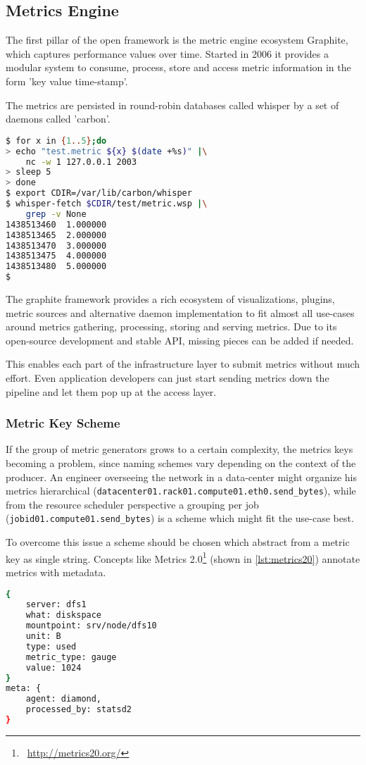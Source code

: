\subsection{Metrics Engine}
The first pillar of the open framework is the metric engine ecosystem Graphite, which captures performance values over time. 
Started in 2006 it provides a modular system to consume, process, store and access metric information in the form 'key value time-stamp'.

The metrics are persisted in round-robin databases called whisper by a set of daemons called 'carbon'.

\begin{lstlisting}[language=bash,
    caption={Sending and receiving metrics using carbon in combination with a whisper file back-end.},
    label={lst:carbon_wsp}]
$ for x in {1..5};do
> echo "test.metric ${x} $(date +%s)" |\
    nc -w 1 127.0.0.1 2003
> sleep 5
> done
$ export CDIR=/var/lib/carbon/whisper
$ whisper-fetch $CDIR/test/metric.wsp |\
    grep -v None
1438513460	1.000000
1438513465	2.000000
1438513470	3.000000
1438513475	4.000000
1438513480	5.000000
$
\end{lstlisting}

The graphite framework provides a rich ecosystem of visualizations, plugins, metric sources and alternative daemon implementation to fit almost
all use-cases around metrics gathering, processing, storing and serving metrics. Due to its open-source development and stable API, missing pieces
can be added if needed.

This enables each part of the infrastructure layer to submit metrics without much effort. Even application developers can just start sending metrics down the pipeline and
let them pop up at the access layer.

\subsubsection{Metric Key Scheme}

If the group of metric generators grows to a certain complexity, the metrics keys becoming a problem, since naming schemes vary depending on the context of
the producer. An engineer overseeing the network in a data-center might organize his metrics hierarchical (\lstinline{datacenter01.rack01.compute01.eth0.send_bytes}), while from the
resource scheduler perspective a grouping per job (\lstinline{jobid01.compute01.send_bytes}) is a scheme which might fit the use-case best.

To overcome this issue a scheme should be chosen which abstract from a metric key as single string.
Concepts like Metrics 2.0\footnote{\Mundus~\url{http://metrics20.org/}} (shown in \autoref{lst:metrics20}) annotate metrics with metadata.

\begin{lstlisting}[language=bash,
    caption={Metrics2.0 formatted metric},
    label={lst:metrics20}]
{
    server: dfs1
    what: diskspace
    mountpoint: srv/node/dfs10
    unit: B
    type: used
    metric_type: gauge
    value: 1024
}
meta: {
    agent: diamond,
    processed_by: statsd2
}
\end{lstlisting}
